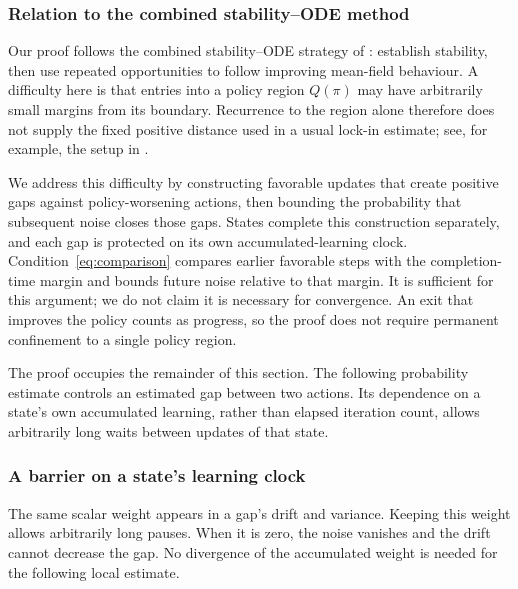 \subsubsection{Relation to the combined stability--ODE method}
\label{sec: limitations of existing methods}
Our proof follows the combined stability--ODE strategy of \citet[Section~5.4]{Kushner2003StochasticApplications}: establish stability, then use repeated opportunities to follow improving mean-field behaviour. A difficulty here is that entries into a policy region $Q(\pi)$ may have arbitrarily small margins from its boundary. Recurrence to the region alone therefore does not supply the fixed positive distance used in a usual lock-in estimate; see, for example, the setup in \citet[Section~3]{Borkar2002OnApproximation}.

We address this difficulty by constructing favorable updates that create positive gaps against policy-worsening actions, then bounding the probability that subsequent noise closes those gaps. States complete this construction separately, and each gap is protected on its own accumulated-learning clock. Condition~\eqref{eq:comparison} compares earlier favorable steps with the completion-time margin and bounds future noise relative to that margin. It is sufficient for this argument; we do not claim it is necessary for convergence. An exit that improves the policy counts as progress, so the proof does not require permanent confinement to a single policy region.

The proof occupies the remainder of this section. The following probability estimate controls an estimated gap between two actions. Its dependence on a state's own accumulated learning, rather than elapsed iteration count, allows arbitrarily long waits between updates of that state.
\subsubsection{A barrier on a state's learning clock}
The same scalar weight appears in a gap's drift and variance. Keeping this weight allows arbitrarily long pauses. When it is zero, the noise vanishes and the drift cannot decrease the gap. No divergence of the accumulated weight is needed for the following local estimate.

